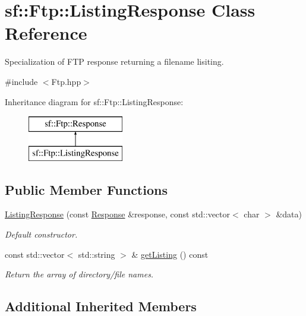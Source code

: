 \hypertarget{classsf_1_1Ftp_1_1ListingResponse}{\section{sf\-:\-:Ftp\-:\-:Listing\-Response Class Reference}
\label{classsf_1_1Ftp_1_1ListingResponse}
}


Specialization of F\-T\-P response returning a filename lisiting.  




{\ttfamily \#include $<$Ftp.\-hpp$>$}

Inheritance diagram for sf\-:\-:Ftp\-:\-:Listing\-Response\-:\begin{figure}[H]
\begin{center}
\leavevmode
\includegraphics[height=2.000000cm]{classsf_1_1Ftp_1_1ListingResponse}
\end{center}
\end{figure}
\subsection*{Public Member Functions}
\begin{DoxyCompactItemize}
\item 
\hyperlink{classsf_1_1Ftp_1_1ListingResponse_aefc1b85e59ee0c3ee180666b4a4631e4}{Listing\-Response} (const \hyperlink{classsf_1_1Ftp_1_1Response}{Response} \&response, const std\-::vector$<$ char $>$ \&data)
\begin{DoxyCompactList}\small\item\em Default constructor. \end{DoxyCompactList}\item 
const std\-::vector$<$ std\-::string $>$ \& \hyperlink{classsf_1_1Ftp_1_1ListingResponse_a5f0771b52a966bf25b33a70602b6f97f}{get\-Listing} () const 
\begin{DoxyCompactList}\small\item\em Return the array of directory/file names. \end{DoxyCompactList}\end{DoxyCompactItemize}
\subsection*{Additional Inherited Members}


